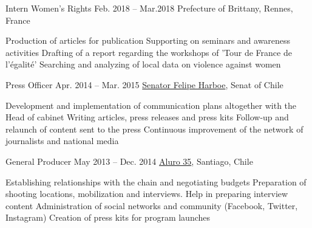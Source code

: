 %
%



\begin{joblist}


\item[Intern Women's Rights ]{Feb. 2018 -- Mar.2018 }     
  	{Prefecture of Brittany, Rennes, France}     
  	{
		\iftbftiny \setlength{\parskip}{-10pt} \fi
		\begin{itemize}
			  \iftbftiny \setlength\itemsep{-3pt} \fi
			  \cvitem[\checkmark] Production of articles for publication
			  \cvitem[\checkmark] Supporting on seminars and awareness activities
			  \cvitem[\checkmark] Drafting of a report regarding the workshops of 'Tour de France de l'égalité'
			  \cvitem[\checkmark] Searching and analyzing of local data on violence against women
		\end{itemize}       
	}


\item[Press Officer]{Apr. 2014 -- Mar. 2015}
     { \href{https://www.harboe.cl/}{Senator Felipe Harboe}, Senat of Chile } 
	 {
			\iftbftiny \setlength{\parskip}{-10pt} \fi
			\begin{itemize}
			  \iftbftiny \setlength\itemsep{-3pt} \fi
			  \cvitem[\checkmark] Development and implementation of communication plans altogether with the Head of cabinet
			  \cvitem[\checkmark] Writing articles, press releases and press kits
			  \cvitem[\checkmark] Follow-up and relaunch of content sent to the press
			  \cvitem[\checkmark] Continuous improvement of the network of journalists and national media
			\end{itemize}     
	}
    
    
    
\item[General Producer]{May 2013 -- Dec. 2014}
     {\href{https://www.aluro35.com/}  {Aluro 35}, Santiago, Chile}
     {	
			\iftbftiny \setlength{\parskip}{-10pt} \fi
			\begin{itemize}
			  \iftbftiny \setlength\itemsep{-3pt} \fi
			  \cvitem[\checkmark] Establishing relationships with the chain and negotiating budgets
			  \cvitem[\checkmark] Preparation of shooting locations, mobilization and interviews. Help in preparing interview content
			  \cvitem[\checkmark] Administration of social networks and community (Facebook, Twitter, Instagram)
			  \cvitem[\checkmark] Creation of press kits for program launches
			\end{itemize}     
	}




\end{joblist}
